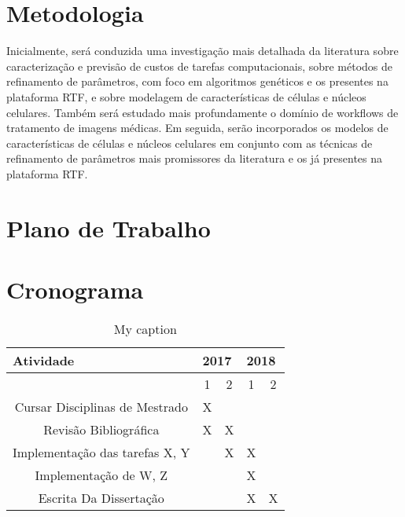 \documentclass[a4paper,10pt]{article}
\begin{document}
\section{Metodologia}
Inicialmente, será conduzida uma investigação mais detalhada da literatura sobre caracterização e previsão de custos de tarefas computacionais, sobre métodos de refinamento de parâmetros, com foco em algoritmos genéticos e os presentes na plataforma RTF, e sobre modelagem de características de células e núcleos celulares. Também será estudado mais profundamente o domínio de workflows de tratamento de imagens médicas. Em seguida, serão incorporados os modelos de características de células e núcleos celulares em conjunto com as técnicas de refinamento de parâmetros mais promissores da literatura e os já presentes na plataforma RTF.

\section{Plano de Trabalho}



\section{Cronograma}
\begin{table}[]
	\centering
	\caption{My caption}
	\label{my-label}
	\begin{tabular}{|c|c|c|c|c|}
		\hline
		\multicolumn{1}{|l|}{Atividade} & \multicolumn{2}{l|}{2017} & \multicolumn{2}{l|}{2018} \\ \hline
		& 1\degree    & 2\degree    & 1\degree    & 2\degree    \\ \hline
		Cursar Disciplinas de Mestrado  & X           &             &             &             \\ \hline
		Revisão Bibliográfica           & X           & X           &             &             \\ \hline
		Implementação das tarefas X, Y  &             & X           & X           &             \\ \hline
		Implementação de W, Z     &             &             & X           &             \\ \hline
		Escrita Da Dissertação          &             &             & X           & X           \\ \hline
	\end{tabular}
\end{table}



	
	
	
\end{document}
